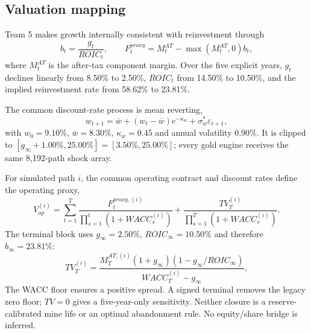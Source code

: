 \subsection{Valuation mapping}
Team 5 makes growth internally consistent with reinvestment through
\begin{equation}
b_t=\frac{g_t}{ROIC_t},\qquad
F_t^{proxy}=M_t^{AT}-\max(M_t^{AT},0)b_t,
\label{eq:reinvestment}
\end{equation}
where $M_t^{AT}$ is the after-tax component margin. Over the five explicit years, $g_t$ declines linearly from 8.50\% to 2.50\%, $ROIC_t$ from 14.50\% to 10.50\%, and the implied reinvestment rate from 58.62\% to 23.81\%.

The common discount-rate process is mean reverting,
\begin{equation}
w_{t+1}=\bar w+(w_t-\bar w)e^{-\kappa_w}+\sigma_w^*\varepsilon_{t+1},
\label{eq:wacc_process}
\end{equation}
with $w_0=9.10\%$, $\bar w=8.30\%$, $\kappa_w=0.45$ and annual volatility 0.90\%. It is clipped to $[g_\infty+1.00\%,25.00\%]=[3.50\%,25.00\%]$; every gold engine receives the same 8,192-path shock array.

For simulated path $i$, the common operating contract and discount rates define the operating proxy,
\begin{equation}
V_{op}^{(i)}=\sum_{t=1}^{T}\frac{F_t^{proxy,(i)}}{\prod_{s=1}^{t}(1+WACC_s^{(i)})}
+\frac{TV_T^{(i)}}{\prod_{s=1}^{T}(1+WACC_s^{(i)})}.
\label{eq:stochvalue}
\end{equation}
The terminal block uses $g_\infty=2.50\%$, $ROIC_\infty=10.50\%$ and therefore $b_\infty=23.81\%$:
\begin{equation}
TV_T^{(i)}=\frac{M_T^{AT,(i)}(1+g_\infty)(1-g_\infty/ROIC_\infty)}{WACC_T^{(i)}-g_\infty},
\label{eq:terminal_value}
\end{equation}
The WACC floor ensures a positive spread. A signed terminal removes the legacy zero floor; $TV=0$ gives a five-year-only sensitivity.
Neither closure is a reserve-calibrated mine life or an optimal abandonment rule. No equity/share bridge is inferred.

